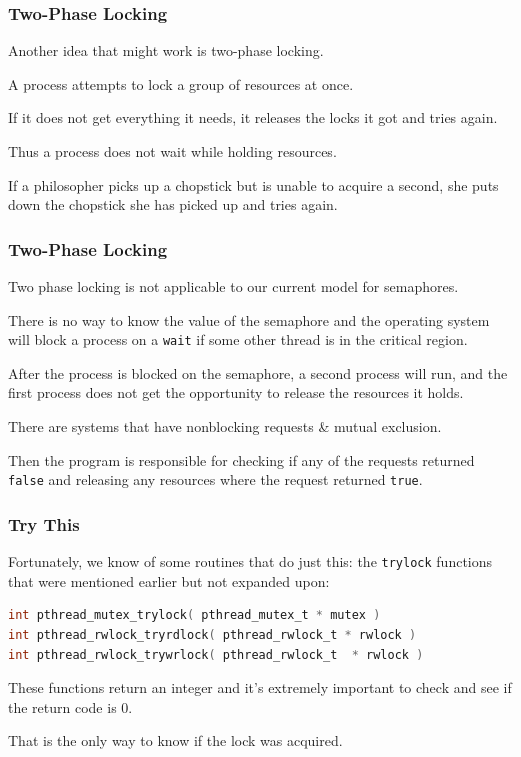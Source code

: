 \begin{frame}
\frametitle{Two-Phase Locking}

Another idea that might work is \alert{two-phase locking}. 

A process attempts to lock a group of resources at once. 

If it does not get everything it needs, it releases the locks it got and tries again. 

Thus a process does not wait while holding resources. 

If a philosopher picks up a chopstick but is unable to acquire a second, she puts down the chopstick she has picked up and tries again.

\end{frame}

\begin{frame}
\frametitle{Two-Phase Locking}

Two phase locking is not applicable to our current model for semaphores.

There is no way to know the value of the semaphore and the operating system will block a process on a \texttt{wait} if some other thread is in the critical region. 

After the process is blocked on the semaphore, a second process will run, and the first process does not get the opportunity to release the resources it holds. 

There are systems that have nonblocking requests \& mutual exclusion.

Then the program is responsible for checking if any of the requests returned \texttt{false} and releasing any resources where the request returned \texttt{true}.


\end{frame}


\begin{frame}[fragile]
\frametitle{Try This}
Fortunately, we know of some routines that do just this: the \texttt{trylock} functions that were mentioned earlier but not expanded upon:
\begin{lstlisting}[language=C]
int pthread_mutex_trylock( pthread_mutex_t * mutex )
int pthread_rwlock_tryrdlock( pthread_rwlock_t * rwlock )
int pthread_rwlock_trywrlock( pthread_rwlock_t  * rwlock )
\end{lstlisting}

These functions return an integer and it's extremely important to check and see if the return code is 0. 

That is the only way to know if the lock was acquired.

\end{frame}



